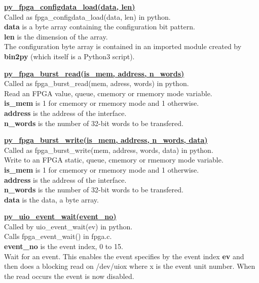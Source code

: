             \underline{{\bf py\_fpga\_configdata\_load(data, len)}} \\

                Called as fpga\_configdata\_load(data, len) in python.\\
                {\bf data} is a byte array containing the configuration bit pattern.\\
                {\bf len} is the dimension of the array.\\
                The configuration byte array is contained in an imported module created by {\bf bin2py}
                (which itself is a Python3 script).

            \underline{{\bf py\_fpga\_burst\_read(is\_mem, address, n\_words)}} \\

                Called as fpga\_burst\_read(mem, adress, words) in python.\\
                Read an FPGA value, queue, cmemory or rmemory mode variable.\\
                {\bf is\_mem} is 1 for cmemory or rmemory mode and 1 otherwise.\\
                {\bf address} is the address of the interface.\\
                {\bf n\_words} is the number of 32-bit words to be transfered.

            \underline{{\bf py\_fpga\_burst\_write(is\_mem, address, n\_words, data)}} \\

                Called as fpga\_burst\_write(mem, address, words, data) in python.\\
                Write to an FPGA static, queue, cmemory or rmemory mode variable.\\
                {\bf is\_mem} is 1 for cmemory or rmemory mode and 1 otherwise.\\
                {\bf address} is the address of the interface.\\
                {\bf n\_words} is the number of 32-bit words to be transfered.\\
                {\bf data} is the data, a byte array.

            \underline{{\bf py\_uio\_event\_wait(event\_no)}} \\

                Called by uio\_event\_wait(ev) in python.\\
                Calls fpga\_event\_wait() in fpga.c.\\
                {\bf event\_no} is the event index, 0 to 15.\\
                Wait for an event. This enables the event specifies by the event index {\bf ev}
                and then does a blocking read on /dev/uiox where x is the event unit number. When
                the read occurs the event is now disabled.

